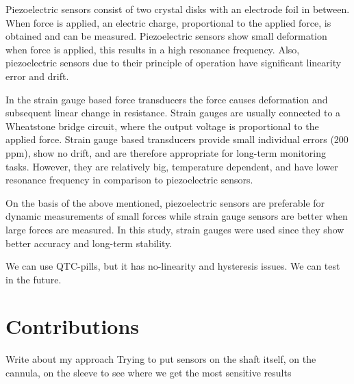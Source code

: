 Piezoelectric sensors consist of two crystal disks with an electrode foil in between. When force is applied, an electric charge, proportional to the applied force, is obtained and can be measured. Piezoelectric sensors show small deformation when force is applied, this results in a high resonance frequency. Also, piezoelectric sensors due to their principle of operation have significant linearity error and drift. \cite{SGandP2}

In the strain gauge based force transducers the force causes deformation and subsequent linear change in resistance. Strain gauges are usually connected to a Wheatstone bridge circuit, where the output voltage is proportional to the applied force. Strain gauge based transducers provide small individual errors (200 ppm), show no drift, and are therefore appropriate for long-term monitoring tasks. However, they are relatively big, temperature dependent, and have lower resonance frequency in comparison to piezoelectric sensors. \cite{SGandP1,SGandP2}

On the basis of the above mentioned, piezoelectric sensors are preferable for dynamic measurements of small forces while strain gauge sensors are better when large forces are measured. In this study, strain gauges were used since they show better accuracy and long-term stability. \cite{SGandP1,SGandP2}

We can use QTC-pills, but it has no-linearity and hysteresis issues. We can test in the future.


\section{Contributions}
\label{sec:MyAppr}
Write about my approach
Trying to put sensors on the shaft itself, on the cannula, on the sleeve to see where we get the most sensitive results
